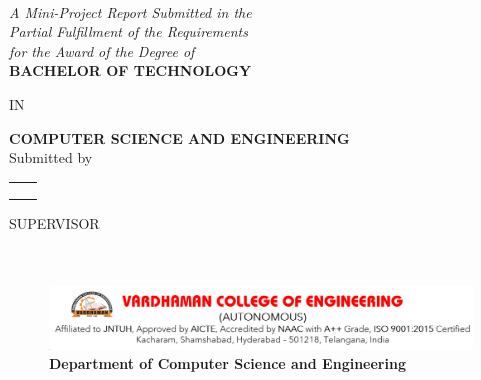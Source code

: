 \begin{titlepage}
\begin{center}
\vspace{2cm} 
\LARGE{\textbf{\textcolor{red}{\thesistitle}} \\%
\vspace{1.5em}%
\normalsize \textit{A Mini-Project Report Submitted in the \\ [0.075in]
Partial Fulfillment of the Requirements\\ [0.075in]
for the Award of the Degree of} \\ [0.075in]
\vspace{1.5em}
\uppercase{\bf{\textsc{Bachelor of Technology}}} \\
\vspace{1em}

IN \\
\vspace{1em}

\textbf{COMPUTER SCIENCE AND ENGINEERING} \\
\vspace{1.5em}
 Submitted by\\

\vspace{1.5em}
\begin{center}
	
	\begin{table}[h!]
		\centering
		\begin{tabular}{l l}
			\textbf{\studentA} & \textbf{\rollA }\\ [0.075in]
			\textbf{\studentB} & \textbf{\rollB} \\ [0.075in]
			\textbf{\studentC} & \textbf{\rollC} \\ [0.075in]
		\end{tabular} 
	\end{table}
\end{center}
SUPERVISOR\\ [0.075in]
\textbf{\guidename}\\ [0.075in]
\textbf{\guidedesignation}\\ [0.075in]




\vspace{0.5cm}
\begin{center}
\begin{figure}[h!]
	\centering
	\caption*{\textbf{Department of Computer Science and Engineering}}
	\includegraphics[scale=0.35]{Pictures/vce.png}
\end{figure}



\end{center}}
\end{center}
\end{titlepage}
